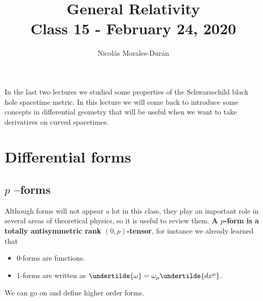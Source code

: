 \documentclass[10pt]{article}
\title{{\Huge General Relativity}\\{\Large{Class 15 - February 24, 2020}}} %
\author{Nicol\'as Morales-Dur\'an}
\begin{document}
    \maketitle
    \flushbottom
    \newpage
    \pagestyle{fancynotes}
	In the last two lectures we studied some properties of the Schwarzschild black hole spacetime metric. In this lecture we will come back to introduce some concepts in differential geometry that will be useful when we want to take derivatives on curved spacetimes. 
     \section{Differential forms}
     \subsection{$p$ --forms}
     	Although forms will not appear a lot in this class, they play an important role in several areas of theoretical physics, so it is useful to review them. \textbf{A $p$-form is a totally antisymmetric rank $(0,p)$-tensor}, for instance we already learned that   
	\begin{itemize}
	\item 0-forms are functions.
	\item 1-forms are written as $\undertilde{\omega}=\omega_{\mu}\undertilde{dx^{\mu}}$.
	\end{itemize}
	We can go on and define higher order forms. 
\end{document}
